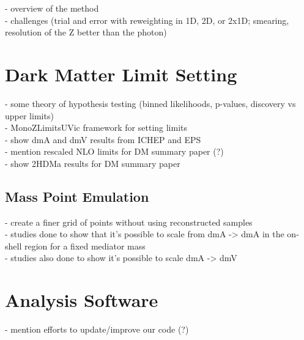 - overview of the method\\
- challenges (trial and error with reweighting in 1D, 2D, or 2x1D; smearing, resolution of the Z better than the photon)\\

\section{Dark Matter Limit Setting}

- some theory of hypothesis testing (binned likelihoods, p-values, discovery vs upper limits)\\
- MonoZLimitsUVic framework for setting limits\\
- show dmA and dmV results from ICHEP and EPS\\
- mention rescaled NLO limits for DM summary paper (?)\\
- show 2HDMa results for DM summary paper\\

\subsection{Mass Point Emulation}

- create a finer grid of points without using reconstructed samples\\
- studies done to show that it's possible to scale from dmA -> dmA in the on-shell region for a fixed mediator mass\\
- studies also done to show it's possible to scale dmA -> dmV\\

\section{Analysis Software}
- mention efforts to update/improve our code (?)